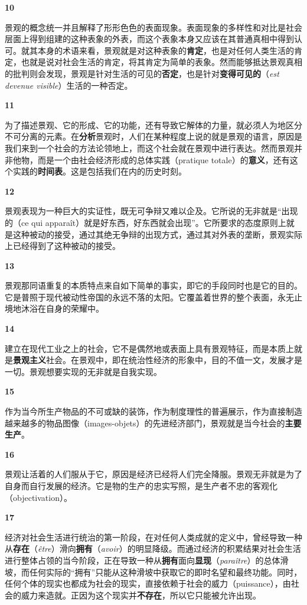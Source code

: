 \documentclass[fontset=fandol, a4paper, 12pt, openright]{ctexbook}
\makeatletter
\newcommand{\thesis}[1]{%
    \par\vspace{1.5em}%
    {\centering \textbf{\Large #1}\par}%
    \nobreak\vspace{0.5em}\nobreak
    \@afterindenttrue %
    \@afterheading    %
}
\makeatother
\begin{document}
\thesis{10}
景观的概念统一并且解释了形形色色的表面现象。表面现象的多样性和对比是社会层面上得到组建的这种表象的外表，而这个表象本身又应该在其普通真相中得到认可。就其本身的术语来看，景观就是对这种表象的\textbf{肯定}，也是对任何人类生活的肯定，也就是说对社会生活的肯定，将其肯定为简单的表象。然而能够抵达景观真相的批判则会发现，景观是针对生活的可见的\textbf{否定}，也是针对\textbf{变得可见的}（\textit{est devenue visible}）生活的一种否定。

\thesis{11}
为了描述景观、它的形成、它的功能，还有导致它解体的力量，就必须人为地区分不可分离的元素。在\textbf{分析}景观时，人们在某种程度上说的就是景观的语言，原因是我们来到一个社会的方法论领地上，而这个社会就在景观中进行表达。然而景观并非他物，而是一个由社会经济形成的总体实践（pratique totale）的\textbf{意义}，还有这个实践的\textbf{时间表}。这是包括我们在内的历史时刻。

\thesis{12}
景观表现为一种巨大的实证性，既无可争辩又难以企及。它所说的无非就是“出现的（ce qui apparaît）就是好东西，好东西就会出现”。它所要求的态度原则上就是这种被动的接受，通过其绝无争辩的出现方式，通过其对外表的垄断，景观实际上已经得到了这种被动的接受。

\thesis{13}
景观那同语重复的本质特点来自如下简单的事实，即它的手段同时也是它的目的。它是普照于现代被动性帝国的永远不落的太阳。它覆盖着世界的整个表面，永无止境地沐浴在自身的荣耀中。

\thesis{14}
建立在现代工业之上的社会，它不是偶然地或表面上具有景观特征，而是本质上就是\textbf{景观主义}社会。在景观中，即在统治性经济的形象中，目的不值一文，发展才是一切。景观想要实现的无非就是自我实现。

\thesis{15}
作为当今所生产物品的不可或缺的装饰，作为制度理性的普遍展示，作为直接制造越来越多的物品图像（images-objets）的先进经济部门，景观就是当今社会的\textbf{主要生产}。

\thesis{16}
景观让活着的人们服从于它，原因是经济已经将人们完全降服。景观无非就是为了自身而自行发展的经济。它是物的生产的忠实写照，是生产者不忠的客观化（objectivation）。

\thesis{17}
经济对社会生活进行统治的第一阶段，在对任何人类成就的定义中，曾经导致一种从\textbf{存在}（\textit{être}）滑向\textbf{拥有}（\textit{avoir}）的明显降级。而通过经济的积累结果对社会生活进行整体占领的当今阶段，正在导致一种从\textbf{拥有}面向\textbf{显现}（\textit{paraître}）的总体滑坡，而任何实际的“拥有”只能从这种滑坡中获取它的即时名望和最终功能。同时，任何个体的现实也都成为社会的现实，直接依赖于社会的威力（puissance），由社会的威力来造就。正因为这个现实并\textbf{不存在}，所以它只能被允许出现。
\end{document}
